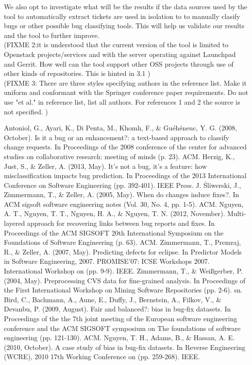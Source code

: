 \documentclass[runningheads,a4paper]{llncs}
\begin{document}
We also opt to investigate what will be the results if the data sources used by the tool to automatically extract tickets are used in isolation to to manually clasify bugs or other possible bug classifying tools. This will help us validate our results and the tool to further improve.\\

(FIXME 2:it is understood that the current version of the tool is limited to Openstack projects/services and with the server operating against Launchpad and Gerrit. How well can the tool support other OSS projects through use of other kinds of repositories. This is hinted in 3.1 )\\
(FIXME 3: There are three styles specifying authors in the reference list. Make it uniform and conformant with the Springer conference paper requirements. Do not use "et al." in reference list, list all authors. For references 1 and 2 the source is not specified.
)

\begin{thebibliography}{4}

Antoniol, G., Ayari, K., Di Penta, M., Khomh, F., \& Gu\'eh\'eneuc, Y. G. (2008, October). Is it a bug or an enhancement?: a text-based approach to classify change requests. In Proceedings of the 2008 conference of the center for advanced studies on collaborative research: meeting of minds (p. 23). ACM.
Herzig, K., Just, S., \& Zeller, A. (2013, May). It's not a bug, it's a feature: how misclassification impacts bug prediction. In Proceedings of the 2013 International Conference on Software Engineering (pp. 392-401). IEEE Press.
J. Śliwerski, J., Zimmermann, T., \& Zeller, A. (2005, May). When do changes induce fixes?. In ACM sigsoft software engineering notes (Vol. 30, No. 4, pp. 1-5). ACM.
Nguyen, A. T., Nguyen, T. T., Nguyen, H. A., \& Nguyen, T. N. (2012, November). Multi-layered approach for recovering links between bug reports and fixes. In Proceedings of the ACM SIGSOFT 20th International Symposium on the Foundations of Software Engineering (p. 63). ACM.
Zimmermann, T., Premraj, R., \& Zeller, A. (2007, May). Predicting defects for eclipse. In Predictor Models in Software Engineering, 2007. PROMISE'07: ICSE Workshops 2007. International Workshop on (pp. 9-9). IEEE.
Zimmermann, T., \& Weißgerber, P. (2004, May). Preprocessing CVS data for fine-grained analysis. In Proceedings of the First International Workshop on Mining Software Repositories (pp. 2-6). sn.
Bird, C., Bachmann, A., Aune, E., Duffy, J., Bernstein, A., Filkov, V., \& Devanbu, P. (2009, August). Fair and balanced?: bias in bug-fix datasets. In Proceedings of the the 7th joint meeting of the European software engineering conference and the ACM SIGSOFT symposium on The foundations of software engineering (pp. 121-130). ACM.
Nguyen, T. H., Adams, B., \& Hassan, A. E. (2010, October). A case study of bias in bug-fix datasets. In Reverse Engineering (WCRE), 2010 17th Working Conference on (pp. 259-268). IEEE.
\end{thebibliography}
\end{document}
